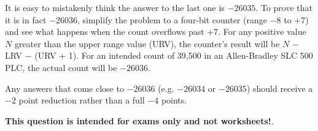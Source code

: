 It is easy to mistakenly think the answer to the last one is $-26035$.  To prove that it is in fact $-26036$, simplify the problem to a four-bit counter (range $-8$ to +7) and see what happens when the count overflows past +7.  For any positive value $N$ greater than the upper range value (URV), the counter's result will be $N$ $-$ LRV $-$ (URV + 1).  For an intended count of 39,500 in an Allen-Bradley SLC 500 PLC, the actual count will be $-26036$.  

Any answers that come close to $-26036$ (e.g. $-26034$ or $-26035$) should receive a $-2$ point reduction rather than a full $-4$ points.







{\bf This question is intended for exams only and not worksheets!}.


